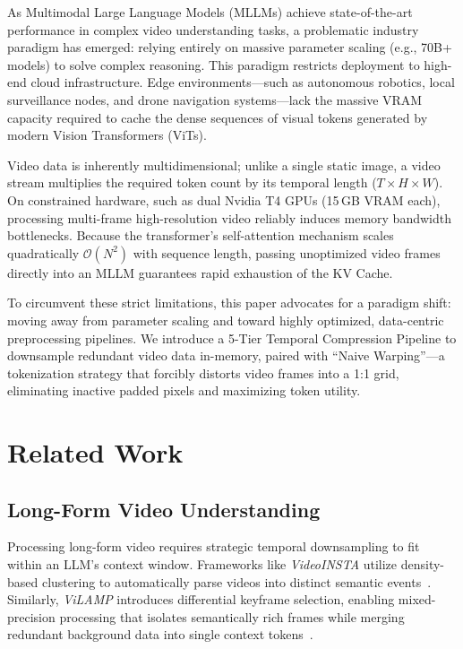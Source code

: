 \documentclass[conference]{IEEEtran}
\newcommand{\bigO}[1]{\mathcal{O}\!\left(#1\right)}
\begin{document}
As Multimodal Large Language Models (MLLMs) achieve state-of-the-art
performance in complex video understanding tasks, a problematic industry
paradigm has emerged: relying entirely on massive parameter scaling
(e.g., 70B+ models) to solve complex reasoning. This paradigm restricts
deployment to high-end cloud infrastructure. Edge environments---such as
autonomous robotics, local surveillance nodes, and drone navigation
systems---lack the massive VRAM capacity required to cache the dense
sequences of visual tokens generated by modern Vision Transformers
(ViTs).

Video data is inherently multidimensional; unlike a single static image,
a video stream multiplies the required token count by its temporal length
($T \times H \times W$). On constrained hardware, such as dual Nvidia T4
GPUs (15\,GB VRAM each), processing multi-frame high-resolution video
reliably induces memory bandwidth bottlenecks. Because the transformer's
self-attention mechanism scales quadratically $\bigO{N^2}$ with sequence
length, passing unoptimized video frames directly into an MLLM guarantees
rapid exhaustion of the KV Cache.

To circumvent these strict limitations, this paper advocates for a
paradigm shift: moving away from parameter scaling and toward highly
optimized, data-centric preprocessing pipelines. We introduce a 5-Tier
Temporal Compression Pipeline to downsample redundant video data
in-memory, paired with ``Naive Warping''---a tokenization strategy that
forcibly distorts video frames into a 1:1 grid, eliminating inactive
padded pixels and maximizing token utility.

\section{Related Work}
\label{sec:related}

\subsection{Long-Form Video Understanding}

Processing long-form video requires strategic temporal downsampling to
fit within an LLM's context window. Frameworks like \textit{VideoINSTA}
utilize density-based clustering to automatically parse videos into
distinct semantic events~\cite{liao2024videoinsta}. Similarly,
\textit{ViLAMP} introduces differential keyframe selection, enabling
mixed-precision processing that isolates semantically rich frames while
merging redundant background data into single context
tokens~\cite{cheng2024vilamp}.
\end{document}
